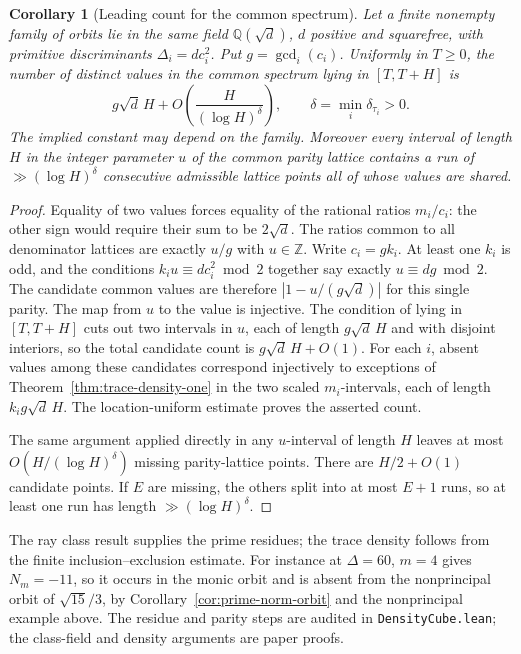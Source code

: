 \documentclass[11pt]{amsart}
\newtheorem{corollary}[theorem]{Corollary}
\theoremstyle{definition}
\theoremstyle{remark}
\numberwithin{equation}{section}
\newcommand{\Q}{\mathbb{Q}}
\newcommand{\Z}{\mathbb{Z}}
\begin{document}
\begin{corollary}[Leading count for the common spectrum]
\label{cor:trace-common-density}
Let a finite nonempty family of orbits lie in the same
field $\Q(\sqrt d)$, $d$ positive and squarefree, with primitive
discriminants $\Delta_i=d c_i^2$. Put $g=\gcd_i(c_i)$.
Uniformly in $T\ge0$, the number of distinct values in the
common spectrum lying in $[T,T+H]$ is
\[
 g\sqrt d\,H+O\!\left(\frac{H}{(\log H)^{\delta}}\right),
 \qquad \delta=\min_i\delta_{\tau_i}>0.
\]
The implied constant may depend on the family.
Moreover every interval of length $H$ in the integer
parameter $u$ of the common parity lattice contains a run
of $\gg (\log H)^\delta$ consecutive admissible lattice points
all of whose values are shared.
\end{corollary}
\begin{proof}
Equality of two values forces equality of the rational ratios
$m_i/c_i$: the other sign would require their sum to be
$2\sqrt d$. The ratios common to all denominator lattices
are exactly $u/g$ with $u\in\Z$. Write $c_i=g k_i$.
At least one $k_i$ is odd, and the conditions
$k_i u\equiv d c_i^2\bmod2$ together say exactly
$u\equiv dg\bmod2$. The candidate common values are therefore
$|1-u/(g\sqrt d)|$ for this single parity. The map from $u$
to the value is injective. The condition of lying in
$[T,T+H]$ cuts out two intervals in $u$, each of length
$g\sqrt d\,H$ and with disjoint interiors, so the total
candidate count is $g\sqrt d\,H+O(1)$.
For each $i$, absent values among these candidates correspond
injectively to exceptions of Theorem~\ref{thm:trace-density-one}
in the two scaled $m_i$-intervals, each of length
$k_i g\sqrt d\,H$. The location-uniform estimate proves the
asserted count.

The same argument applied directly in any $u$-interval
of length $H$ leaves at most $O(H/(\log H)^\delta)$
missing parity-lattice points. There are $H/2+O(1)$
candidate points. If $E$ are missing, the others split into
at most $E+1$ runs, so at least one run has length
$\gg (\log H)^\delta$.
\end{proof}
The ray class result supplies the prime residues; the trace
density follows from the finite inclusion--exclusion estimate.
For instance at $\Delta=60$, $m=4$ gives $N_m=-11$, so it
occurs in the monic orbit and is absent from the nonprincipal
orbit of $\sqrt{15}/3$, by Corollary~\ref{cor:prime-norm-orbit}
and the nonprincipal example above. The residue and parity
steps are audited in \texttt{DensityCube.lean}; the class-field
and density arguments are paper proofs.
\end{document}
